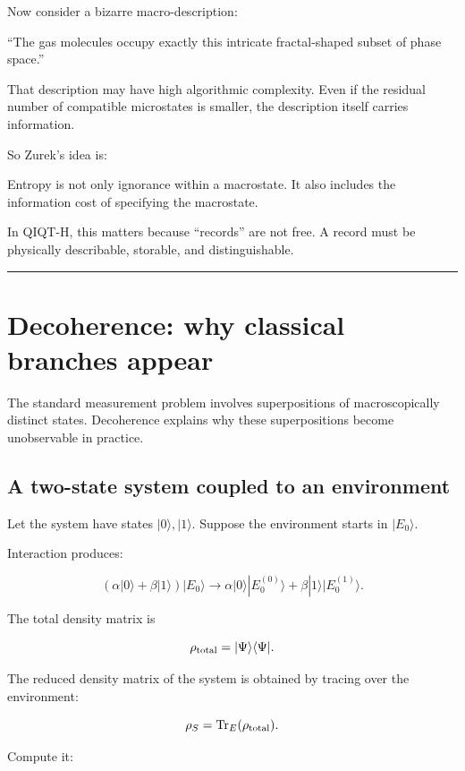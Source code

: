 \documentclass[11pt,a4paper]{article}
\newenvironment{qiqtquote}{\begin{mdframed}[style=quotestyle]}{\end{mdframed}}
\begin{document}
Now consider a bizarre macro-description:

\begin{qiqtquote}
“The gas molecules occupy exactly this intricate fractal-shaped subset of phase space.”
\end{qiqtquote}

That description may have high algorithmic complexity. Even if the residual number of compatible microstates is smaller, the description itself carries information.

So Zurek’s idea is:

\begin{qiqtquote}
Entropy is not only ignorance within a macrostate. It also includes the information cost of specifying the macrostate.
\end{qiqtquote}

In QIQT-H, this matters because “records” are not free. A record must be physically describable, storable, and distinguishable.

\medskip\hrule\medskip

\section{Decoherence: why classical branches appear}

The standard measurement problem involves superpositions of macroscopically distinct states. Decoherence explains why these superpositions become unobservable in practice.

\subsection{A two-state system coupled to an environment}

Let the system have states $|0\rangle, |1\rangle$. Suppose the environment starts in $|E_0\rangle$.

Interaction produces:

\[
(\alpha|0\rangle+\beta|1\rangle)|E_0\rangle
\longrightarrow
\alpha|0\rangle|E_0^{(0)}\rangle
+
\beta|1\rangle|E_0^{(1)}\rangle.
\]

The total density matrix is

\[
\rho_{\rm total}
=
|\Psi\rangle\langle\Psi|.
\]

The reduced density matrix of the system is obtained by tracing over the environment:

\[
\rho_S = \mathrm{Tr}_E(\rho_{\rm total}).
\]

Compute it:
\end{document}
